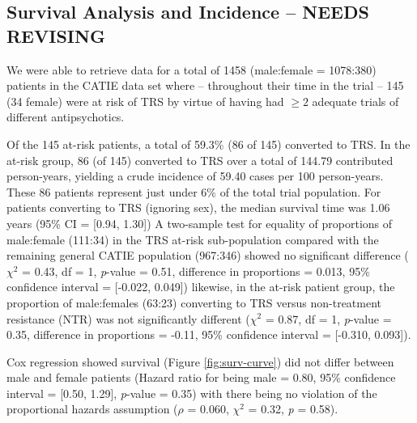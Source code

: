 \documentclass[a4paper,nobib]{article}
\begin{document}
\subsection{Survival Analysis and Incidence -- NEEDS REVISING}

We were able to retrieve data for a total of 1458 (male:female = 1078:380) patients in the CATIE data set where -- throughout their time in the trial -- 145 (34 female) were at risk of TRS by virtue of having had $\geqslant 2$ adequate trials of different antipsychotics. 

Of the 145 at-risk patients, a total of 59.3\% (86 of 145) converted to TRS.  In the at-risk group, 86 (of 145) converted to TRS over a total of 144.79 contributed person-years, yielding a crude incidence of 59.40 cases per 100 person-years. These 86 patients represent just under 6\% of the total trial population.  For patients converting to TRS (ignoring sex), the median survival time was 1.06 years (95\% CI = [0.94, 1.30])   A two-sample test for equality of proportions of male:female (111:34) in the TRS at-risk sub-population compared with the remaining general CATIE population (967:346) showed no significant difference ($\chi^2$ = 0.43, df = 1, \emph{p}-value = 0.51, difference in proportions = 0.013, 95\% confidence interval = [-0.022, 0.049]) likewise, in the at-risk patient group, the proportion of male:females (63:23) converting to TRS versus non-treatment resistance (NTR) was not significantly different ($\chi^2$ = 0.87, df = 1, \emph{p}-value = 0.35, difference in proportions = -0.11, 95\% confidence interval = [-0.310, 0.093]).  

Cox regression showed survival (Figure \ref{fig:surv-curve}) did not differ between male and female patients (Hazard ratio for being male = 0.80, 95\% confidence interval = [0.50, 1.29], \emph{p}-value = 0.35) with there being no violation of the proportional hazards assumption ($\rho$ = 0.060, $\chi^2$ = 0.32, \emph{p} = 0.58).  
\end{document}
